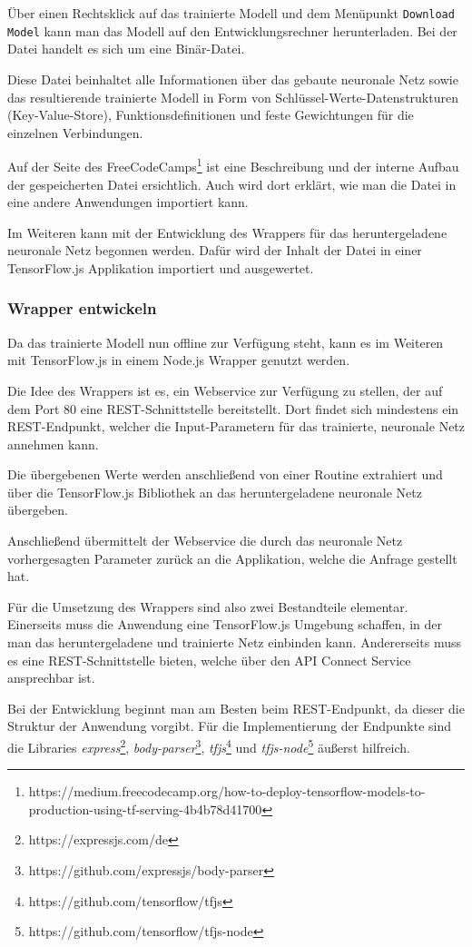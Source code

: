 Über einen Rechtsklick auf das trainierte Modell und dem Menüpunkt \texttt{Download Model} kann man das Modell auf den
Entwicklungsrechner herunterladen. Bei der Datei handelt es sich um eine Binär-Datei.

Diese Datei beinhaltet alle Informationen über das gebaute neuronale Netz sowie das resultierende trainierte Modell in
Form von Schlüssel-Werte-Datenstrukturen (Key-Value-Store), Funktionsdefinitionen und feste Gewichtungen für die
einzelnen Verbindungen.

Auf der Seite des
FreeCodeCamps\footnote{https://medium.freecodecamp.org/how-to-deploy-tensorflow-models-to-production-using-tf-serving-4b4b78d41700}
ist eine Beschreibung und der interne Aufbau der gespeicherten Datei ersichtlich. Auch wird dort erklärt, wie man die
Datei in eine andere Anwendungen importiert kann.

Im Weiteren kann mit der Entwicklung des Wrappers für das heruntergeladene neuronale Netz begonnen werden. Dafür wird
der Inhalt der Datei in einer TensorFlow.js Applikation importiert und ausgewertet.

\subsubsection{Wrapper entwickeln}
Da das trainierte Modell nun offline zur Verfügung steht, kann es im Weiteren mit TensorFlow.js in einem Node.js Wrapper
genutzt werden.

Die Idee des Wrappers ist es, ein Webservice zur Verfügung zu stellen, der auf dem Port 80 eine REST-Schnittstelle
bereitstellt. Dort findet sich mindestens ein REST-Endpunkt, welcher die Input-Parametern für das trainierte,
neuronale Netz annehmen kann.

Die übergebenen Werte werden anschließend von einer Routine extrahiert und über die TensorFlow.js Bibliothek an das
heruntergeladene neuronale Netz übergeben.

Anschließend übermittelt der Webservice die durch das neuronale Netz vorhergesagten Parameter zurück an die Applikation,
welche die Anfrage gestellt hat.

Für die Umsetzung des Wrappers sind also zwei Bestandteile elementar. Einerseits muss die Anwendung eine TensorFlow.js
Umgebung schaffen, in der man das heruntergeladene und trainierte Netz einbinden kann. Andererseits muss es eine
REST-Schnittstelle bieten, welche über den API Connect Service ansprechbar ist.

Bei der Entwicklung beginnt man am Besten beim REST-Endpunkt, da dieser die Struktur der Anwendung vorgibt. Für die
Implementierung der Endpunkte sind die Libraries \textit{express}\footnote{https://expressjs.com/de},
\textit{body-parser}\footnote{https://github.com/expressjs/body-parser},
\textit{tfjs}\footnote{https://github.com/tensorflow/tfjs} und
\textit{tfjs-node}\footnote{https://github.com/tensorflow/tfjs-node} äußerst hilfreich.

